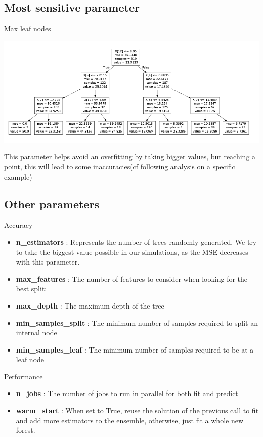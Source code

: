 \documentclass[10pt]{beamer}
\begin{document}
\subsection{Most sensitive parameter}

\begin{frame}{Max leaf nodes}
	
	\centering
	\includegraphics[scale=0.4]{max_leaf_nodes.png}
	
	This parameter helps avoid an overfitting by taking bigger values, but reaching a point, this will lead to some inaccuracies(cf following analysis on a specific example)
\end{frame}

\subsection{Other parameters}

\begin{frame}{Accuracy}
	\begin{itemize}
		\item \textbf{n\_estimators} : Represents the number of trees randomly generated. 
		We try to take the biggest value possible in our simulations, as the MSE decreases with this parameter. 
		\item \textbf{max\_features} : The number of features to consider when looking for the best split:
		\item \textbf{max\_depth} : The maximum depth of the tree
		\item \textbf{min\_samples\_split } : The minimum number of samples required to split an internal node
		\item \textbf{min\_samples\_leaf } : The minimum number of samples required to be at a leaf node
	\end{itemize}
	
\end{frame}

\begin{frame}{Performance}
	\begin{itemize}
		\item \textbf{n\_jobs} : The number of jobs to run in parallel for both fit and predict
		\item \textbf{warm\_start} : When set to True, reuse the solution of the previous call to fit and add more estimators to the ensemble, otherwise, just fit a whole new forest.
	\end{itemize}
	
\end{frame}
\end{document}
